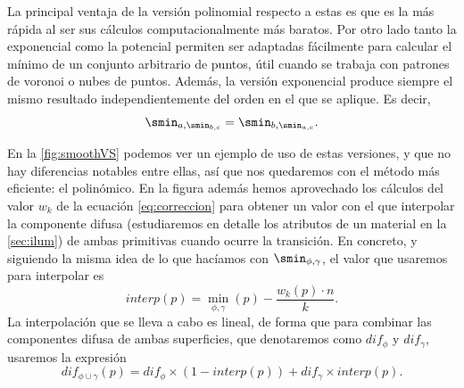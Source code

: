 La principal ventaja de la versión polinomial respecto a estas es que es la más rápida al ser sus cálculos computacionalmente más baratos. Por otro lado tanto la exponencial como la potencial permiten ser adaptadas fácilmente para calcular el mínimo de un conjunto arbitrario de puntos, útil cuando se trabaja con patrones de voronoi o nubes de puntos. Además, la versión exponencial produce siempre el mismo resultado independientemente del orden en el que se aplique. Es decir,
\begin{equation*}
    \smin_{a,\smin_{b,c}} = \smin_{b,\smin_{a,c}}.
\end{equation*}

En la \autoref{fig:smoothVS} podemos ver un ejemplo de uso de estas versiones, y que no hay diferencias notables entre ellas, así que nos quedaremos con el método más eficiente: el polinómico. En la figura además hemos aprovechado los cálculos del valor $w_k$ de la ecuación \eqref{eq:correccion} para obtener un valor con el que interpolar la componente difusa (estudiaremos en detalle los atributos de un material en la \autoref{sec:ilum}) de ambas primitivas cuando ocurre la transición. En concreto, y siguiendo la misma idea de lo que hacíamos con $\smin_{\phi,\gamma}$, el valor que usaremos para interpolar es
\begin{equation*}
    interp(p) = \min_{\phi,\gamma}(p) - \frac{w_k(p)\cdot n}{k}.
\end{equation*}
La interpolación que se lleva a cabo es lineal, de forma que para combinar las componentes difusa de ambas superficies, que denotaremos como $dif_{\phi}$ y $dif_{\gamma}$, usaremos la expresión
\begin{equation*}
    dif_{\phi\cup\gamma}(p) = dif_{\phi} \times (1 - interp(p))+dif_{\gamma} \times interp(p).
\end{equation*}

